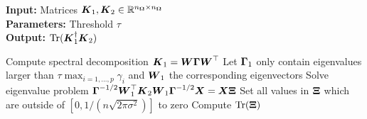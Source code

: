 \hspace*{\algorithmicindent} \textbf{Input:} Matrices $\boldsymbol{K}_1, \boldsymbol{K}_2 \in \mathbb{R}^{n_{\boldsymbol{\Omega}} \times n_{\boldsymbol{\Omega}}}$ \\
\hspace*{\algorithmicindent} \textbf{Parameters:} Threshold $\tau$ \\
\hspace*{\algorithmicindent} \textbf{Output:} $\operatorname{Tr}(\boldsymbol{K}_1^{\dagger} \boldsymbol{K}_2)$
\begin{algorithmic}[1]
    \State Compute spectral decomposition $\boldsymbol{K}_1 = \boldsymbol{W} \boldsymbol{\Gamma} \boldsymbol{W}^{\top}$
    \State Let $\boldsymbol{\Gamma}_1$ only contain eigenvalues larger than $\tau \max_{i=1, \dots, p} \gamma_i$ and $\boldsymbol{W}_1$ the corresponding eigenvectors
    \State Solve eigenvalue problem $\boldsymbol{\Gamma}^{-1/2} \boldsymbol{W}_1^{\top} \boldsymbol{K}_2 \boldsymbol{W}_1 \boldsymbol{\Gamma}^{-1/2} \boldsymbol{X} = \boldsymbol{X} \boldsymbol{\Xi}$
    \State Set all values in $\boldsymbol{\Xi}$ which are outside of $[0, 1 / (n \sqrt{2 \pi \sigma^2})]$ to zero
    \State Compute $\operatorname{Tr}(\boldsymbol{\Xi})$
\end{algorithmic}
